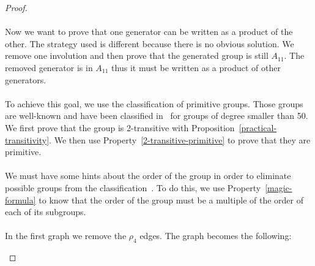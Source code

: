 \begin{proof}
\begin{figure}[H]
\begin{center}
\begin{tikzpicture}[scale=.8]
    \end{tikzpicture}
    \caption{}
  \end{center}
\end{figure}

\paragraph{}
Now we want to prove that one generator can be written as a product of the other. The strategy used is different because there is no obvious solution. We remove one involution and then prove that the generated group is still $A_{11}$. The removed generator is in $A_{11}$ thus it must be written as a product of other generators.

\paragraph{}
To achieve this goal, we use the classification of primitive groups. Those groups are well-known and have been classified in~\cite{buekenhout1996list} for groups of degree smaller than 50. We first prove that the group is 2-transitive with Proposition~\ref{practical-transitivity}. We then use Property~\ref{2-transitive-primitive} to prove that they are primitive.

\paragraph{}
We must have some hints about the order of the group in order to eliminate possible groups from the classification~\cite{buekenhout1996list}. To do this, we use Property~\ref{magic-formula} to know that the order of the group must be a multiple of the order of each of its subgroups.

\paragraph{}
In the first graph we remove the $\rho_4$ edges. The graph becomes the following:

\begin{figure}[H]
  \begin{center}
\end{center}
\end{figure}
\end{proof}
